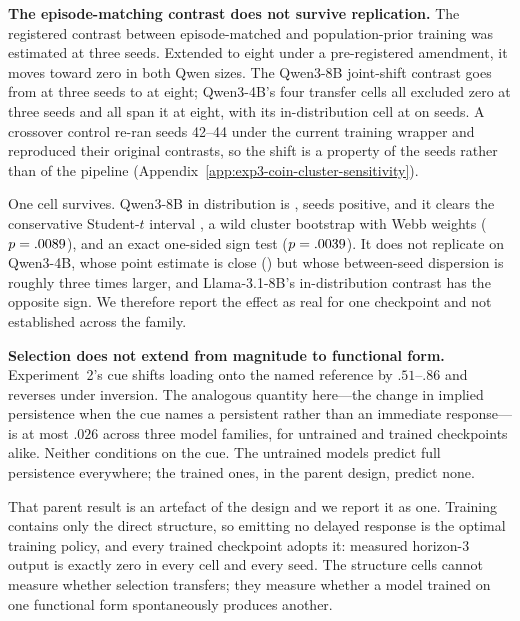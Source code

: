 \textbf{The episode-matching contrast does not survive replication.}
The registered contrast between episode-matched and population-prior training
was estimated at three seeds. Extended to eight under a pre-registered
amendment, it moves toward zero in both Qwen sizes. The Qwen3-8B joint-shift
contrast goes from \ePubEightJointEst{} \ePubEightJointCi{} at three seeds to
\eEightJointEst{} \eEightJointCi{} at eight; Qwen3-4B's four transfer cells all
excluded zero at three seeds and all span it at eight, with its
in-distribution cell at \eFourbIdEst{} \eFourbIdCi{} on \eFourbIdSign{} seeds.
A crossover control re-ran seeds 42--44 under the current training wrapper and
reproduced their original contrasts, so the shift is a property of the seeds
rather than of the pipeline (Appendix~\ref{app:exp3-coin-cluster-sensitivity}).

One cell survives. Qwen3-8B in distribution is \eEightIdEst{} \eEightIdCi{},
\eEightIdSign{} seeds positive, and it clears the conservative Student-$t$
interval \eEightIdTci{}, a wild cluster bootstrap with Webb weights
($p=.0089{}$), and an exact one-sided sign test
($p=.0039{}$). It does not replicate on Qwen3-4B, whose point estimate
is close (\eFourbIdEst{}) but whose between-seed dispersion is roughly three
times larger, and Llama-3.1-8B's in-distribution contrast has the opposite
sign. We therefore report the effect as real for one checkpoint and not
established across the family.



\textbf{Selection does not extend from magnitude to functional form.}
Experiment~2's cue shifts loading onto the named reference by $.51$--$.86$ and
reverses under inversion. The analogous quantity here---the change in implied
persistence when the cue names a persistent rather than an immediate
response---is at most $.026$ across three model families, for untrained and
trained checkpoints alike. Neither conditions on the cue. The untrained models
predict full persistence everywhere; the trained ones, in the parent design,
predict none.

That parent result is an artefact of the design and we report it as one.
Training contains only the direct structure, so emitting no delayed response is
the optimal training policy, and every trained checkpoint adopts it: measured
horizon-3 output is exactly zero in every cell and every seed. The structure
cells cannot measure whether selection transfers; they measure whether a model
trained on one functional form spontaneously produces another.

